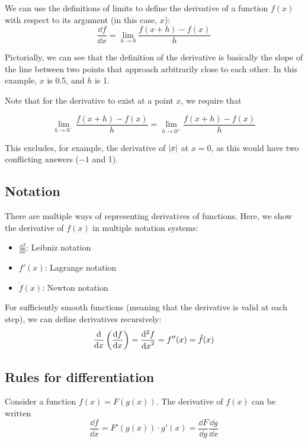 \begin{definition}[Derivative]
	We can use the definitions of limits to define the derivative of a function \(f(x)\) with respect to its argument (in this case, \(x\)):
	\begin{equation}\label{derivative}
		\frac{\dd{f}}{\dd{x}} = \lim_{h \to 0} \frac{f(x+h)-f(x)}{h}
	\end{equation}
\end{definition}

Pictorially, we can see that the definition of the derivative is basically the slope of the line between two points that approach arbitrarily close to each other.
In this example, \(x\) is 0.5, and \(h\) is 1.

Note that for the derivative to exist at a point \(x\), we require that

\[
	\lim_{h \to 0^-} \frac{f(x+h)-f(x)}{h} = \lim_{h \to 0^+} \frac{f(x+h)-f(x)}{h}
\]

This excludes, for example, the derivative of \(\abs{x}\) at \(x=0\), as this would have two conflicting answers (\(-1\) and 1).

\subsection{Notation}
There are multiple ways of representing derivatives of functions.
Here, we show the derivative of \(f(x)\) in multiple notation systems:
\begin{itemize}
	\item \(\displaystyle \frac{\dd{f}}{\dd{x}}\): Leibniz notation
	\item \(f'(x)\): Lagrange notation
	\item \(\dot f (x)\): Newton notation
\end{itemize}

For sufficiently smooth functions (meaning that the derivative is valid at each step), we can define derivatives recursively:
\[
	\frac{\mathrm{d}}{\dd{x}}\left( \frac{\dd{f}}{\dd{x}} \right)
	= \frac{\mathrm{d}^2f}{\dd{x}^2}
	= f''(x) = \ddot f (x)
\]

\subsection{Rules for differentiation}
\begin{definition}
	Consider a function \(f(x) = F(g(x))\).
	The derivative of \(f(x)\) can be written
	\begin{equation}
		\frac{\dd{f}}{\dd{x}} = F'(g(x)) \cdot g'(x) = \frac{\dd{F}}{\dd{g}} \frac{\dd{g}}{\dd{x}}
	\end{equation}
\end{definition}

